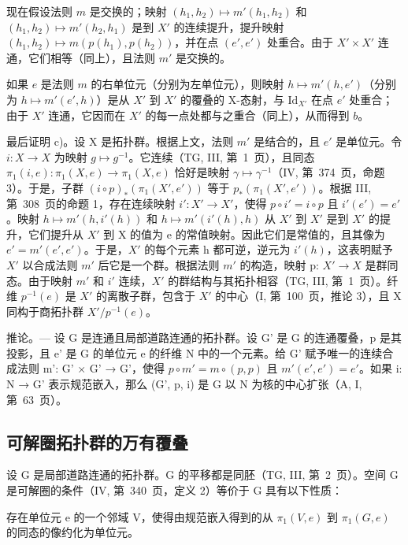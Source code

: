 现在假设法则 \(m\) 是交换的；映射 \((h_1, h_2) \mapsto m'(h_1, h_2)\) 和 \((h_1, h_2) \mapsto m'(h_2, h_1)\) 是到 \(X'\) 的连续提升，提升映射 \((h_1, h_2) \mapsto m(p(h_1), p(h_2))\)，并在点 \((e', e')\) 处重合。由于 \(X' \times X'\) 连通，它们相等（同上），且法则 \(m'\) 是交换的。

如果 \(e\) 是法则 \(m\) 的右单位元（分别为左单位元），则映射 \(h \mapsto m'(h, e')\)（分别为 \(h \mapsto m'(e', h)\)）是从 \(X'\) 到 \(X'\) 的覆叠的 X-态射，与 \(\text{Id}_{X'}\) 在点 \(e'\) 处重合；由于 \(X'\) 连通，它因而在 \(X'\) 的每一点处都与之重合（同上），从而得到 \(b\)。

最后证明 c)。设 X 是拓扑群。根据上文，法则 \(m'\) 是结合的，且 \(e'\) 是单位元。令 \(i: X \to X\) 为映射 \(g \mapsto g^{-1}\)。它连续（TG, III, 第~1~页），且同态 \(\pi_{1}(i,e): \pi_{1}(X,e) \to \pi_{1}(X,e)\) 恰好是映射 \(\gamma \mapsto \gamma^{-1}\)（IV, 第~374~页，命题 3）。于是，子群 \((i \circ p)_{*}(\pi_{1}(X',e'))\) 等于 \(p_{*}(\pi_{1}(X',e'))\)。根据 III, 第~308~页的命题 1，存在连续映射 \(i': X' \to X'\)，使得 \(p \circ i' = i \circ p\) 且 \(i'(e') = e'\)。映射 \(h \mapsto m'(h,i'(h))\) 和 \(h \mapsto m'(i'(h),h)\) 从 \(X'\) 到 \(X'\) 是到 \(X'\) 的提升，它们提升从 \(X'\) 到 X 的值为 e 的常值映射。因此它们是常值的，且其像为 \(e' = m'(e',e')\)。于是，\(X'\) 的每个元素 h 都可逆，逆元为 \(i'(h)\)，这表明赋予 \(X'\) 以合成法则 \(m'\) 后它是一个群。根据法则 \(m'\) 的构造，映射 p: \(X' \to X\) 是群同态。由于映射 \(m'\) 和 \(i'\) 连续，\(X'\) 的群结构与其拓扑相容（TG, III, 第~1~页）。纤维 \(p^{-1}(e)\) 是 \(X'\) 的离散子群，包含于 \(X'\) 的中心（I, 第~100~页，推论 3），且 X 同构于商拓扑群 \(X'/p^{-1}(e)\)。

推论。--- 设 G 是连通且局部道路连通的拓扑群。设 G' 是 G 的连通覆叠，p 是其投影，且 e' 是 G 的单位元 e 的纤维 N 中的一个元素。给 G' 赋予唯一的连续合成法则 m': G' × G' → G'，使得 \(p \circ m' = m \circ (p, p)\) 且 \(m'(e', e') = e'\)。如果 i: N → G' 表示规范嵌入，那么 (G', p, i) 是 G 以 N 为核的中心扩张（A, I, 第~63~页）。

\subsection{可解圈拓扑群的万有覆叠}

设 G 是局部道路连通的拓扑群。G 的平移都是同胚（TG, III, 第~2~页）。空间 G 是可解圈的条件（IV, 第~340~页，定义 2）等价于 G 具有以下性质：

存在单位元 e 的一个邻域 V，使得由规范嵌入得到的从 \(\pi_{1}(V,e)\) 到 \(\pi_{1}(G,e)\) 的同态的像约化为单位元。

